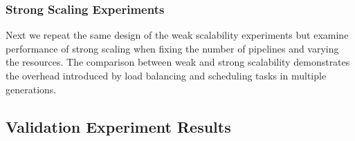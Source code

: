 
\subsubsection {Strong Scaling Experiments}

Next we repeat the same design of the weak scalability experiments but examine
performance of strong scaling when fixing the number of pipelines and varying
the resources. The comparison between weak and strong scalability demonstrates
the overhead introduced by load balancing and scheduling tasks in multiple
generations.









\subsection{Validation Experiment Results}

